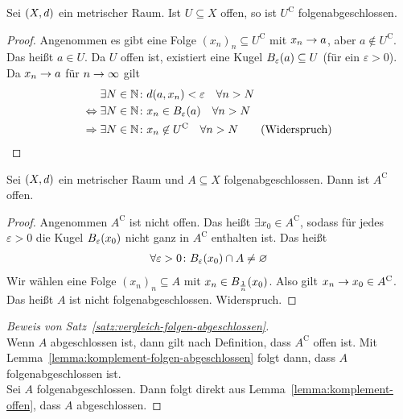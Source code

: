 \begin{lemma} %
    \label{lemma:komplement-folgen-abgeschlossen}
    Sei $\left(X, d\right)$ ein metrischer Raum. Ist $U\subseteq X$ offen, so ist $U^{\mathrm{C}}$ folgenabgeschlossen.

    \begin{proof}
        Angenommen es gibt eine Folge $(x_n)_n \subseteq U^{\mathrm{C}}$ mit $x_n\rightarrow{} a$, aber $a\not\in U^{\mathrm{C}}$. Das heißt $a\in U$. Da $U$ offen ist, existiert eine Kugel $B_{\varepsilon}\of{a} \subseteq U$ (für ein $\varepsilon > 0$). Da $x_n\rightarrow{} a$ für $n\rightarrow{}\infty$ gilt
        \begin{align*}
            \exists N\in\N\colon &d\of{a, x_n} < \varepsilon\quad\forall n> N \\
            \equivalent \exists N\in\N\colon &x_n \in B_{\varepsilon}\of{a}\quad\forall n > N\\
            \impl \exists N\in\N\colon &x_n\not\in U^{\mathrm{C}}\quad\forall n > N\tag*{(Widerspruch)\qedhere}
        \end{align*}
    \end{proof}
\end{lemma}

\begin{lemma}
    \label{lemma:komplement-offen}
    Sei $\left(X, d\right)$ ein metrischer Raum und $A\subseteq X$ folgenabgeschlossen. Dann ist $A^{\mathrm{C}}$ offen.

    \begin{proof}
        Angenommen $A^{\mathrm{C}}$ ist nicht offen. Das heißt $\exists x_0 \in A^{\mathrm{C}}$, sodass für jedes $\varepsilon > 0$ die Kugel $B_{\varepsilon}\of{x_0}$ nicht ganz in $A^{\mathrm{C}}$ enthalten ist. Das heißt
        \begin{align*}
            \forall\varepsilon > 0\colon B_{\varepsilon}\of{x_0}\cap A \neq \emptyset
        \end{align*}
        Wir wählen eine Folge $(x_n)_n\subseteq A$ mit $x_n\in B_{\frac{1}{n}}\of{x_0}$. Also gilt $x_n\rightarrow{} x_0\in A^{\mathrm{C}}$. Das heißt $A$ ist nicht folgenabgeschlossen. Widerspruch.
    \end{proof}
\end{lemma}

\begin{proof}[Beweis von Satz~\ref{satz:vergleich-folgen-abgeschlossen}]
    ~\\
    \anf{$\impl$} Wenn $A$ abgeschlossen ist, dann gilt nach Definition, dass $A^{\mathrm{C}}$ offen ist. Mit Lemma~\ref{lemma:komplement-folgen-abgeschlossen} folgt dann, dass $A$ folgenabgeschlossen ist.\\
    \anf{$\Leftarrow$} Sei $A$ folgenabgeschlossen. Dann folgt direkt aus Lemma~\ref{lemma:komplement-offen}, dass $A$ abgeschlossen.
\end{proof}

